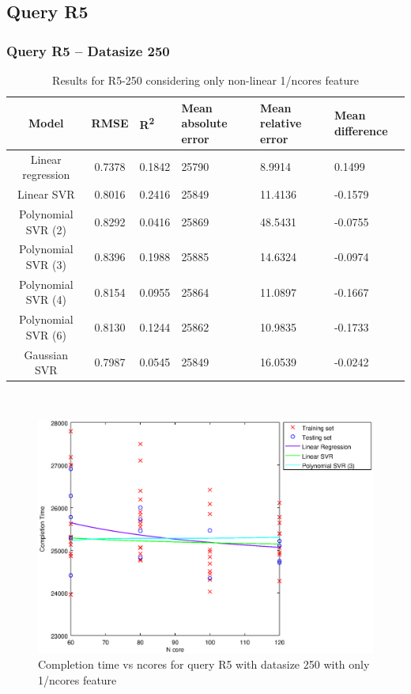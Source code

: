 \documentclass[a4paper,11pt]{article}
\begin{document}
\newpage
\subsection{Query R5}
\subsubsection{Query R5 -- Datasize 250}
\begin{table}[H]
	\centering
	\begin{adjustbox}{center}
		\begin{tabular}{c | c M{1.2cm} M{2.5cm} M{2.5cm} M{1.8cm}}
			Model & RMSE & R\textsuperscript{2} & Mean absolute error & Mean relative error & Mean difference \tabularnewline
			\hline
			Linear regression & 0.7378 & 0.1842 &  25790 & 8.9914 & 0.1499 \\
			Linear SVR & 0.8016 & 0.2416 &  25849 & 11.4136 & -0.1579 \\
			Polynomial SVR (2) & 0.8292 & 0.0416 &  25869 & 48.5431 & -0.0755 \\
			Polynomial SVR (3) & 0.8396 & 0.1988 &  25885 & 14.6324 & -0.0974 \\
			Polynomial SVR (4) & 0.8154 & 0.0955 &  25864 & 11.0897 & -0.1667 \\
			Polynomial SVR (6) & 0.8130 & 0.1244 &  25862 & 10.9835 & -0.1733 \\
			Gaussian SVR & 0.7987 & 0.0545 &  25849 & 16.0539 & -0.0242 \\
		\end{tabular}
	\end{adjustbox}
	\\
	\caption{Results for R5-250 considering only non-linear 1/ncores feature}
	\label{table_R5_prediction_all}
\end{table}

\begin {figure}[hbtp]
\centering
\includegraphics[width=\textwidth]{output/R5_250_ONLY_1_OVER_NCORES/plot_R5_250_bestmodels.eps}
\caption {Completion time vs ncores for query R5 with datasize 250 with only 1/ncores feature}
\end {figure}
\end{document}
